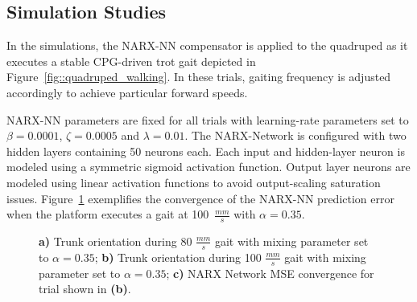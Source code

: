 \subsection{Simulation Studies}


In the simulations, the NARX-NN compensator is applied to the quadruped as it executes a stable CPG-driven trot gait depicted in  Figure~\ref{fig::quadruped_walking}. In these trials, gaiting frequency is adjusted accordingly to achieve particular forward speeds.

NARX-NN parameters are fixed for all trials with learning-rate  parameters set to $\beta=0.0001$, $\zeta=0.0005$ and $\lambda = 0.01$. The NARX-Network is configured with two hidden layers containing 50 neurons each. Each input and hidden-layer neuron is modeled using a symmetric sigmoid activation function. Output layer neurons are modeled using linear activation functions to avoid output-scaling saturation issues. Figure~\ref{fig::fast} exemplifies the convergence of the NARX-NN prediction error when the platform executes a gait at  100~$\frac{mm}{s}$ with $\alpha = 0.35$.

\begin{figure}[h!]
	\centering
	\begin{subfigure}{0.475\textwidth}
		\centering
		\caption{ }
	\end{subfigure}
	\begin{subfigure}{0.475\textwidth}
		\centering
		\caption{ } 
	\end{subfigure}
	\begin{subfigure}{0.475\textwidth}
		\centering
		\caption{ } 
	\end{subfigure}
	\caption{ 
		\textbf{a)} Trunk orientation during 80 $\frac{mm}{s}$ gait with mixing parameter set to $\alpha = 0.35$;
		\textbf{b)} Trunk orientation during 100 $\frac{mm}{s}$ gait with mixing parameter set to $\alpha = 0.35$;
		\textbf{c)} NARX Network MSE convergence for trial shown in \textbf{(b)}.
	}
	\label{fig::fast}
	\PostImageCloseSpace
\end{figure}

